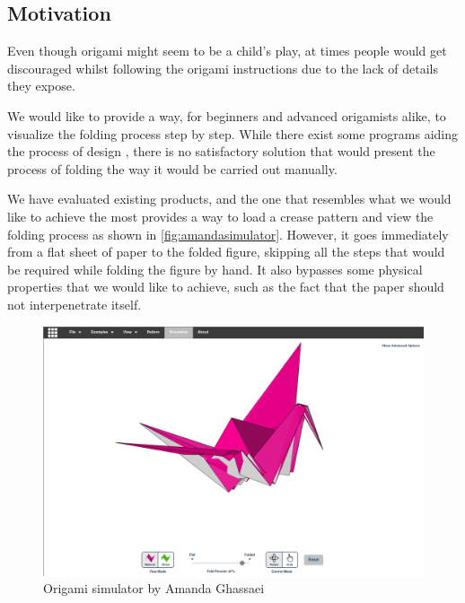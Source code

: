\subsection{Motivation}

Even though origami might seem to be a child's play, at times
people would get discouraged whilst following the origami instructions due to
the lack of details they expose.

We would like to provide a way, for beginners and advanced origamists alike,
to visualize the folding process step by step.
While there exist some programs aiding the process of design \cite{app:treemaker}\cite{app:omto}\cite{app:origami-draw}, there is no satisfactory solution 
that would present the process of folding the way it would be carried out manually.

We have evaluated existing products, and the one that resembles 
what we would like to achieve the most \cite{origami-simulator} provides a way to load a crease pattern
and view the folding process as shown in \autoref{fig:amandasimulator}. 
However, it goes immediately from a flat sheet of paper to the folded figure, skipping all the steps
that would be required while folding the figure by hand.
It also bypasses some physical properties that we would like to achieve, such as the fact that the
paper should not interpenetrate itself.


\begin{figure}[H]
	\caption{Origami simulator by Amanda Ghassaei\label{fig:amandasimulator}}
  \centering
    \includegraphics[width=\textwidth]{assets/origami-simulator.png}
\end{figure}

\clearpage 

